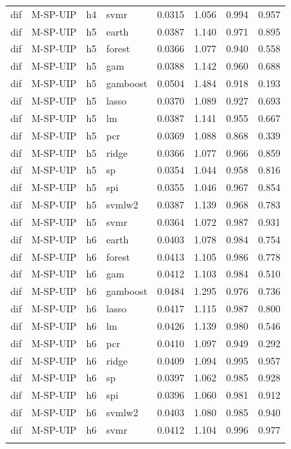 \begin{ThreePartTable}
\begin{longtable}[t]{llclcccc}
dif & M-SP-UIP & h4 & svmr & 0.0315 & 1.056 & 0.994 & 0.957\\
\addlinespace
dif & M-SP-UIP & h5 & earth & 0.0387 & 1.140 & 0.971 & 0.895\\
dif & M-SP-UIP & h5 & forest & 0.0366 & 1.077 & 0.940 & 0.558\\
dif & M-SP-UIP & h5 & gam & 0.0388 & 1.142 & 0.960 & 0.688\\
dif & M-SP-UIP & h5 & gamboost & 0.0504 & 1.484 & 0.918 & 0.193\\
dif & M-SP-UIP & h5 & lasso & 0.0370 & 1.089 & 0.927 & 0.693\\
dif & M-SP-UIP & h5 & lm & 0.0387 & 1.141 & 0.955 & 0.667\\
dif & M-SP-UIP & h5 & pcr & 0.0369 & 1.088 & 0.868 & 0.339\\
dif & M-SP-UIP & h5 & ridge & 0.0366 & 1.077 & 0.966 & 0.859\\
dif & M-SP-UIP & h5 & sp & 0.0354 & 1.044 & 0.958 & 0.816\\
dif & M-SP-UIP & h5 & spi & 0.0355 & 1.046 & 0.967 & 0.854\\
dif & M-SP-UIP & h5 & svmlw2 & 0.0387 & 1.139 & 0.968 & 0.783\\
dif & M-SP-UIP & h5 & svmr & 0.0364 & 1.072 & 0.987 & 0.931\\
\addlinespace
dif & M-SP-UIP & h6 & earth & 0.0403 & 1.078 & 0.984 & 0.754\\
dif & M-SP-UIP & h6 & forest & 0.0413 & 1.105 & 0.986 & 0.778\\
dif & M-SP-UIP & h6 & gam & 0.0412 & 1.103 & 0.984 & 0.510\\
dif & M-SP-UIP & h6 & gamboost & 0.0484 & 1.295 & 0.976 & 0.736\\
dif & M-SP-UIP & h6 & lasso & 0.0417 & 1.115 & 0.987 & 0.800\\
dif & M-SP-UIP & h6 & lm & 0.0426 & 1.139 & 0.980 & 0.546\\
dif & M-SP-UIP & h6 & pcr & 0.0410 & 1.097 & 0.949 & 0.292\\
dif & M-SP-UIP & h6 & ridge & 0.0409 & 1.094 & 0.995 & 0.957\\
dif & M-SP-UIP & h6 & sp & 0.0397 & 1.062 & 0.985 & 0.928\\
dif & M-SP-UIP & h6 & spi & 0.0396 & 1.060 & 0.981 & 0.912\\
dif & M-SP-UIP & h6 & svmlw2 & 0.0403 & 1.080 & 0.985 & 0.940\\
dif & M-SP-UIP & h6 & svmr & 0.0412 & 1.104 & 0.996 & 0.977\\
\addlinespace

\end{longtable}
\end{ThreePartTable}
